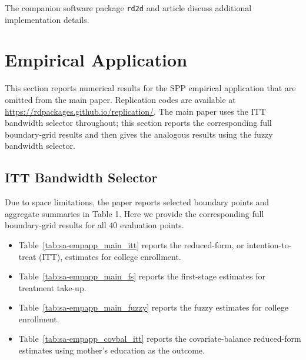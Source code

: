 \documentclass[10pt]{article}
\begin{document}
The companion software package \texttt{rd2d} and article \citep{Cattaneo-Titiunik-Yu_2025_rd2d} discuss additional implementation details.

\section{Empirical Application}

This section reports numerical results for the SPP empirical application that are omitted from the main paper. Replication codes are available at \url{https://rdpackages.github.io/replication/}. The main paper uses the ITT bandwidth selector throughout; this section reports the corresponding full boundary-grid results and then gives the analogous results using the fuzzy bandwidth selector.


\subsection{ITT Bandwidth Selector}

Due to space limitations, the paper reports selected boundary points and aggregate summaries in Table 1. Here we provide the corresponding full boundary-grid results for all $40$ evaluation points.
\begin{itemize}
    \item Table~\ref{tab:sa-empapp_main_itt} reports the reduced-form, or intention-to-treat (ITT), estimates for college enrollment.
    \item Table~\ref{tab:sa-empapp_main_fs} reports the first-stage estimates for treatment take-up.
    \item Table~\ref{tab:sa-empapp_main_fuzzy} reports the fuzzy estimates for college enrollment.
    \item Table~\ref{tab:sa-empapp_covbal_itt} reports the covariate-balance reduced-form estimates using mother's education as the outcome.
\end{itemize}
\end{document}
